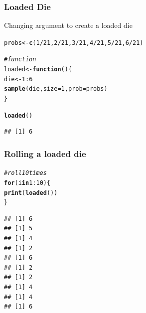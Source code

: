 \documentclass[12pt]{beamer}\usepackage[]{graphicx}\usepackage[]{color}
\makeatletter
\newcommand{\hlnum}[1]{\textcolor[rgb]{0.686,0.059,0.569}{#1}}%
\newcommand{\hlcom}[1]{\textcolor[rgb]{0.678,0.584,0.686}{\textit{#1}}}%
\newcommand{\hlopt}[1]{\textcolor[rgb]{0,0,0}{#1}}%
\newcommand{\hlstd}[1]{\textcolor[rgb]{0.345,0.345,0.345}{#1}}%
\newcommand{\hlkwa}[1]{\textcolor[rgb]{0.161,0.373,0.58}{\textbf{#1}}}%
\newcommand{\hlkwb}[1]{\textcolor[rgb]{0.69,0.353,0.396}{#1}}%
\newcommand{\hlkwc}[1]{\textcolor[rgb]{0.333,0.667,0.333}{#1}}%
\newcommand{\hlkwd}[1]{\textcolor[rgb]{0.737,0.353,0.396}{\textbf{#1}}}%
\newenvironment{kframe}{%
 \def\at@end@of@kframe{}%
 \ifinner\ifhmode%
  \def\at@end@of@kframe{\end{minipage}}%
  \begin{minipage}{\columnwidth}%
 \fi\fi%
 \def\FrameCommand##1{\hskip\@totalleftmargin \hskip-\fboxsep
 \colorbox{shadecolor}{##1}\hskip-\fboxsep
     \hskip-\linewidth \hskip-\@totalleftmargin \hskip\columnwidth}%
 \MakeFramed {\advance\hsize-\width
   \@totalleftmargin\z@ \linewidth\hsize
   \@setminipage}}%
 {\par\unskip\endMakeFramed%
 \at@end@of@kframe}
\newenvironment{knitrout}{}{} %
\makeatother
\begin{document}
\begin{frame}[fragile]
\frametitle{Loaded Die}

Changing argument {\hilit {}} to create a loaded die
\begin{knitrout}\footnotesize
{}\color{fgcolor}\begin{kframe}
\begin{alltt}
\hlstd{probs} \hlkwb{<-} \hlkwd{c}\hlstd{(}\hlnum{1}\hlopt{/}\hlnum{21}\hlstd{,} \hlnum{2}\hlopt{/}\hlnum{21}\hlstd{,}\hlnum{3}\hlopt{/}\hlnum{21}\hlstd{,} \hlnum{4}\hlopt{/}\hlnum{21}\hlstd{,} \hlnum{5}\hlopt{/}\hlnum{21}\hlstd{,} \hlnum{6}\hlopt{/}\hlnum{21}\hlstd{)}

\hlcom{# function}
\hlstd{loaded} \hlkwb{<-} \hlkwa{function}\hlstd{() \{}
  \hlstd{die} \hlkwb{<-} \hlnum{1}\hlopt{:}\hlnum{6}
  \hlkwd{sample}\hlstd{(die,} \hlkwc{size} \hlstd{=} \hlnum{1}\hlstd{,} \hlkwc{prob} \hlstd{= probs)}
\hlstd{\}}
\end{alltt}
\end{kframe}
\end{knitrout}

\pause
\begin{knitrout}\footnotesize
{}\color{fgcolor}\begin{kframe}
\begin{alltt}
\hlkwd{loaded}\hlstd{()}
\end{alltt}
\begin{verbatim}
## [1] 6
\end{verbatim}
\end{kframe}
\end{knitrout}
\end{frame}


\begin{frame}[fragile]
\frametitle{Rolling a loaded die}
\begin{knitrout}\footnotesize
{}\color{fgcolor}\begin{kframe}
\begin{alltt}
\hlcom{# roll 10 times}
\hlkwa{for} \hlstd{(i} \hlkwa{in} \hlnum{1}\hlopt{:}\hlnum{10}\hlstd{) \{}
  \hlkwd{print}\hlstd{(}\hlkwd{loaded}\hlstd{())}
\hlstd{\}}
\end{alltt}
\begin{verbatim}
## [1] 6
## [1] 5
## [1] 4
## [1] 2
## [1] 6
## [1] 2
## [1] 2
## [1] 4
## [1] 4
## [1] 6
\end{verbatim}
\end{kframe}
\end{knitrout}

\end{frame}
\end{document}
